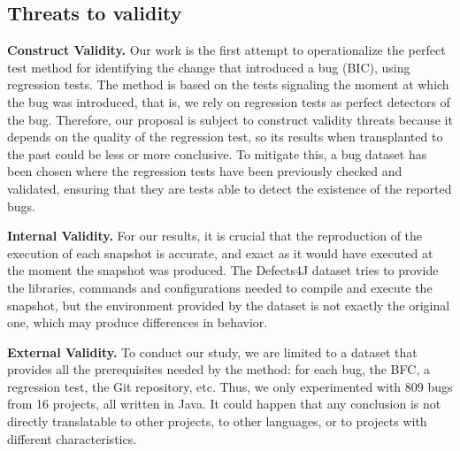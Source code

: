 \subsection{Threats to validity}
\label{sec:threats}

\textbf{Construct Validity.}
Our work is the first attempt to operationalize the perfect test method for identifying the change that introduced a bug (BIC), using regression tests. 
The method is based on the tests signaling the moment at which the bug was introduced, that is, we rely on regression tests as perfect detectors of the bug. 
Therefore, our proposal is subject to construct validity threats because it depends on the quality of the regression test, so its results when transplanted to the past could be less or more conclusive. 
To mitigate this, a bug dataset has been chosen where the regression tests have been previously checked and validated, ensuring that they are tests able to detect the existence of the reported bugs.

\textbf{Internal Validity.}
For our results, it is crucial that the reproduction of the execution of each snapshot is accurate, and exact as it would have executed at the moment the snapshot was produced. 
The Defects4J dataset tries to provide the libraries, commands and configurations needed to compile and execute the snapshot, but the environment provided by the dataset is not exactly the original one,  which may produce differences in behavior.

\textbf{External Validity.}
To conduct our study, we are limited to a dataset that provides all the prerequisites needed by the method: for each bug, the BFC, a regression test, the Git repository, etc. Thus, we only experimented with 809 bugs from 16 projects, all written in Java. It could happen that any conclusion is not directly translatable to other projects, to other languages, or to projects with different characteristics.

